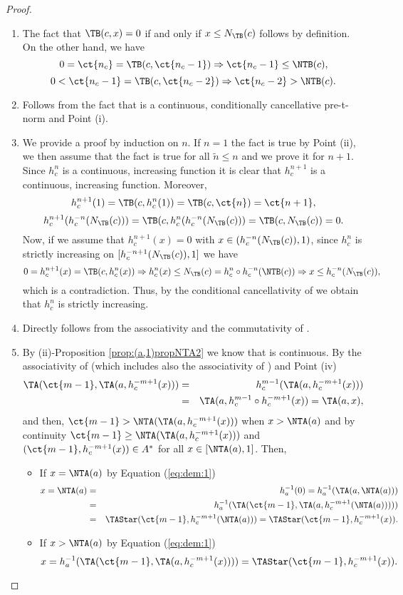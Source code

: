 \begin{proof}
	\begin{enumerate}[label=(\roman*)]
		\item The fact that $\TB(c,x)=0$ if and only if $x \leq N_{\TB}(c)$ follows by definition. On the other hand, we have
		$$0 = \ct{n_c} = \TB(c,\ct{n_c-1}) \Rightarrow \ct{n_c-1} \leq \NTB(c),$$ 
		$$0<\ct{n_c-1}=\TB(c,\ct{n_c-2}) \Rightarrow \ct{n_c-2}>\NTB(c).$$
		\item Follows from the fact that \TB is a continuous, conditionally cancellative pre-t-norm and Point (i).
		\item We provide a proof by induction on $n$. If $n=1$ the fact is true by Point (ii), we then assume that the fact is true for all $\tilde{n} \leq n$ and we prove it for $n+1$. Since $h_c^{n}$ is a continuous, increasing function it is clear that $h_c^{n+1}$ is a continuous, increasing function. Moreover,
		$$h_c^{n+1}(1)=\TB(c,h_c^{n}(1))=\TB(c,\ct{n}) = \ct{n+1},$$
		$$h_c^{n+1}(h_c^{-n}(N_{\TB}(c))) = \TB(c,h_c^{n}(h_c^{-n}(N_{\TB}(c))) = \TB(c,N_{\TB}(c))=0.$$
		Now, if we assume that $h_c^{n+1}(x)=0$ with $x \in (h_c^{-n}(N_{\TB}(c)),1)$, since $h_c^{n}$ is strictly increasing on $[h_c^{-n+1}(N_{\TB}(c)),1]$ we have
		$$0=h_c^{n+1}(x)=\TB(c,h_c^{n}(x)) \Rightarrow h_c^{n}(x) \leq N_{\TB}(c) = h_c^{n} \circ h_c^{-n}(\NTB(c)) \Rightarrow x \leq h_c^{-n}(N_{\TB}(c)),$$
		which is a contradiction. Thus, by the conditional cancellativity of \TB we obtain that $h_c^{n}$ is strictly increasing.
		\item Directly follows from the associativity and the commutativity of \TB.
		\item  By (ii)-Proposition \ref{prop:(a,1)propNTA2} we know that \NTA is continuous. By the associativity of \TB (which includes also the associativity of \TA) and Point (iv)
		\begin{eqnarray}\label{eq:dem:1}
			\TA(\ct{m-1},\TA(a,h_c^{-m+1}(x))) &=& h_c^{m-1}(\TA(a,h_c^{-m+1}(x))) \nonumber \\
			&=& \TA(a,h_c^{m-1} \circ h_c^{-m+1}(x))= \TA(a,x),
		\end{eqnarray}
		and then, $\ct{m-1}>\NTA(\TA(a,h_c^{-m+1}(x)))$ when $x>\NTA(a)$ and by continuity \newline $\ct{m-1}\geq \NTA(\TA(a,h_c^{-m+1}(x)))$ and $(\ct{m-1},h_c^{-m+1}(x)) \in A^*$ for all $x \in [\NTA(a),1]$. Then,
		\begin{itemize}
			\item If $x=\NTA(a)$ by Equation (\ref{eq:dem:1})
			\begin{eqnarray*}
				x=\NTA(a) & = & h_a^{-1}(0)= h_a^{-1}(\TA(a,\NTA(a))) \\
				&=& h_a^{-1}(\TA(\ct{m-1},\TA(a,h_c^{-m+1}(\NTA(a))))) \\
				& = &\TAStar(\ct{m-1},h_c^{-m+1}(\NTA(a))) =\TAStar(\ct{m-1},h_c^{-m+1}(x)).
			\end{eqnarray*}
			\item If $x > \NTA(a)$ by Equation (\ref{eq:dem:1})
			$$x = h_a^{-1}(\TA(\ct{m-1},\TA(a,h_c^{-m+1}(x)))) = \TAStar(\ct{m-1},h_c^{-m+1}(x)).$$
		\end{itemize}
	\end{enumerate}
\end{proof}


